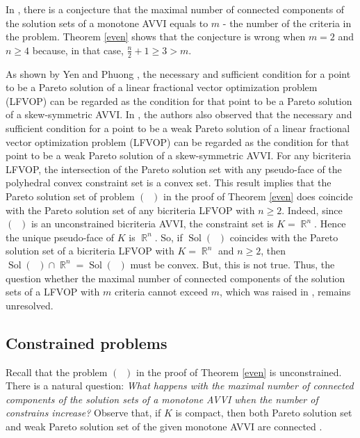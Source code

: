 \documentclass[smallextended,envcountsect]{svjour3}       %
\DeclareMathOperator{\Sol}{Sol}
\DeclareMathOperator{\Pone}{P_0}
\DeclareMathOperator{\R}{\mathbb{R}}
\begin{document}
\begin{remark} In \cite{YY2011}, there is a conjecture that the maximal number of connected components of the solution sets of a monotone AVVI equals to $m$ - the number of the criteria in the problem. Theorem \ref{even} shows that the conjecture is wrong when $m=2$ and $n\geq 4$ because, in that case,  $\frac{n}{2}+1\geq 3>m$.
\end{remark}
\begin{remark} As shown by Yen and Phuong \cite{Yen_Phuong_2000}, the necessary and sufficient condition for a point to be a Pareto solution of a linear fractional vector optimization problem (LFVOP) can be regarded as the condition for that point to be a Pareto solution of a skew-symmetric AVVI. In \cite{Yen_Phuong_2000}, the authors also observed that the necessary and sufficient condition for a point to be a weak Pareto solution of a linear fractional vector optimization problem (LFVOP) can be regarded as the condition for that point to be a weak Pareto solution of a skew-symmetric AVVI. For any bicriteria LFVOP, the intersection of the Pareto solution set with any pseudo-face of the polyhedral convex constraint set is a convex set. This result implies that the Pareto solution set of problem  $(\Pone)$ in the proof of Theorem \ref{even} does coincide with the Pareto solution set of any bicriteria LFVOP with $n\geq 2$. Indeed, since  $(\Pone)$ is an unconstrained bicriteria AVVI, the constraint set is $K=\R^n$. Hence the unique pseudo-face of $K$ is $\R^n$. So, if $\Sol(\Pone)$  coincides with the Pareto solution set of a bicriteria LFVOP with $K=\R^n$ and $n\geq 2$, then $\Sol(\Pone)\cap \R^n=\Sol(\Pone)$ must be convex. But, this is not true. Thus, the question whether the maximal number of connected components of the solution sets of a LFVOP with $m$ criteria cannot exceed $m$, which was raised in \cite{HPY_2002}, remains unresolved. 
\end{remark}
\subsection{Constrained problems}
Recall that the problem $(\Pone)$ in the proof of Theorem \ref{even} is unconstrained. There is a natural question: \textit{What happens with the maximal number of connected components of the solution sets of a monotone AVVI when the number of constrains increase?} Observe that, if $K$ is compact, then both Pareto solution set and weak Pareto solution set of the given monotone AVVI are connected \cite[Theorem 4.1]{YY2011}. 
\end{document}

